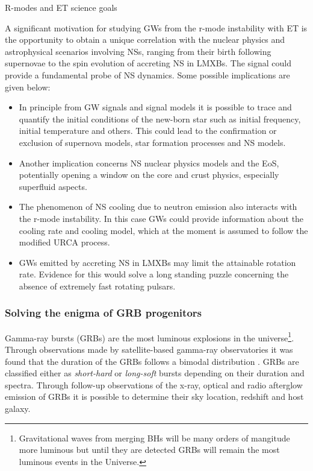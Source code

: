 {R-modes and ET science goals}
{
A significant motivation for studying GWs from the r-mode instability 
with ET is the opportunity to obtain a unique correlation with the nuclear 
physics and astrophysical scenarios involving NSs, ranging from their 
birth following supernovae to the spin evolution of accreting NS in LMXBs. 
The signal could provide a fundamental probe of NS dynamics. Some possible 
implications are given below:
\begin{itemize}
\item In principle from GW signals and signal models it is possible 
to trace and quantify the initial conditions of the new-born star 
such as initial frequency, initial temperature and others. This could 
lead to the confirmation or exclusion of supernova models, star 
formation processes and NS models.
\item Another implication concerns NS nuclear physics models and 
the EoS, potentially opening a window on the core and crust physics, 
especially superfluid aspects.
\item The phenomenon of NS cooling due to neutron emission also 
interacts with the r-mode instability. In this case GWs could 
provide information about the cooling rate and cooling model, 
which at the moment is assumed to follow the modified URCA process.
\item GWs emitted by accreting NS in LMXBs may limit the attainable rotation rate. 
Evidence for this would solve a long standing puzzle concerning the absence of 
extremely fast rotating pulsars. 
\end{itemize}
}

\FloatBarrier
\subsubsection{Solving the enigma of GRB progenitors}


\label{sec:grb_progenitors}

Gamma-ray bursts (GRBs) are the most luminous explosions in the universe\footnote{
Gravitational waves from merging BHs will be many orders of mangitude more
luminous but until they are detected GRBs will remain the most luminous events
in the Universe.}.
Through observations made by satellite-based gamma-ray observatories it was found
that the duration of the GRBs follows a bimodal distribution
\cite{Kouveliotou:1993}.
GRBs are classified either as \emph{short-hard} or \emph{long-soft} bursts depending
on their duration and spectra.
Through follow-up observations of the  x-ray, optical and radio afterglow emission of
GRBs it is possible to determine their sky location, redshift and host galaxy.


